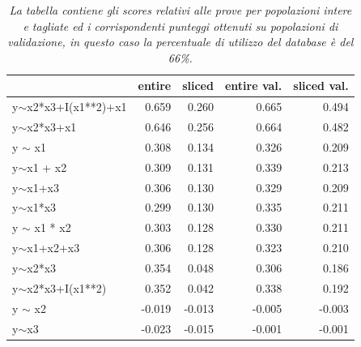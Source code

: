 \documentclass[12pt,openright,twoside,a4paper]{book}
\begin{document}
\begin{table}[!h]
\begin{tabular}{lrrrr}
\toprule
{} &  entire &  sliced &  entire val. &  sliced val. \\
\midrule
y$\sim$x2*x3+I(x1**2)+x1 &         0.659 &         0.260 &             0.665 &             0.494 \\
y$\sim$x2*x3+x1          &         0.646 &         0.256 &             0.664 &             0.482 \\
y $\sim$ x1              &         0.308 &         0.134 &             0.326 &             0.209 \\
y$\sim$x1 + x2           &         0.309 &         0.131 &             0.339 &             0.213 \\
y$\sim$x1+x3             &         0.306 &         0.130 &             0.329 &             0.209 \\
y$\sim$x1*x3             &         0.299 &         0.130 &             0.335 &             0.211 \\
y $\sim$ x1 * x2         &         0.303 &         0.128 &             0.330 &             0.211 \\
y$\sim$x1+x2+x3          &         0.306 &         0.128 &             0.323 &             0.210 \\
y$\sim$x2*x3             &         0.354 &         0.048 &             0.306 &             0.186 \\
y$\sim$x2*x3+I(x1**2)    &         0.352 &         0.042 &             0.338 &             0.192 \\
y $\sim$ x2              &        -0.019 &        -0.013 &            -0.005 &            -0.003 \\
y$\sim$x3                &        -0.023 &        -0.015 &            -0.001 &            -0.001 \\
\bottomrule
\end{tabular}
\caption{\textit{La tabella contiene gli scores relativi alle prove per popolazioni intere e tagliate ed i corrispondenti punteggi  ottenuti su popolazioni di validazione, in questo caso la percentuale di utilizzo del database è del 66\%.}}
\end{table}
\end{document}
